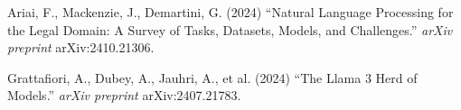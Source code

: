 \documentclass[3p,times,procedia]{elsarticle}
\begin{document}
\begin{thebibliography}{}
Ariai, F., Mackenzie, J., Demartini, G. (2024) ``Natural Language Processing for the Legal Domain: A Survey of Tasks, Datasets, Models, and Challenges.'' {\it arXiv preprint} arXiv:2410.21306.

Grattafiori, A., Dubey, A., Jauhri, A., et al. (2024) ``The Llama 3 Herd of Models.'' {\it arXiv preprint} arXiv:2407.21783.

\end{thebibliography}
\end{document}
